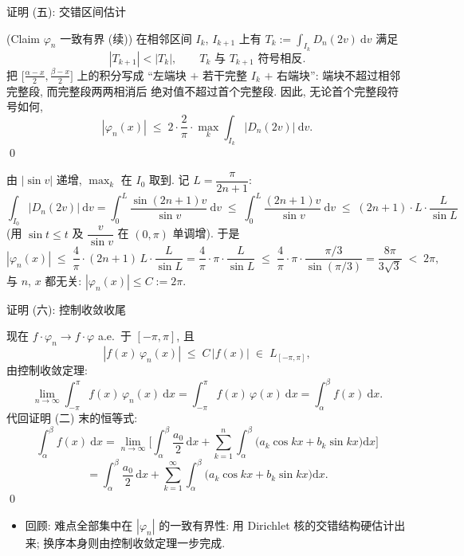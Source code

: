 \begin{frame}{证明 (五): 交错区间估计}

\startproof[bg=yellow, fg=red](Claim $\varphi_n$ 一致有界 (续))
在相邻区间 $I_k$, $I_{k+1}$ 上有
$T_k := \int_{I_k} D_n(2v) ~ \mathrm{d} v$ 满足
\[
|T_{k+1}| < |T_k|,
\qquad
T_k \text{ 与 } T_{k+1} \text{ 符号相反} .
\]
把 $\big[ \tfrac{\alpha - x}{2}, \tfrac{\beta - x}{2} \big]$ 上的积分写成
``左端块 $+$ 若干完整 $I_k$ $+$ 右端块'': 端块不超过相邻完整段, 而完整段两两相消后
绝对值不超过首个完整段. 因此, 无论首个完整段符号如何,
\[
|\varphi_n(x)|
\;\leqslant\; 2 \cdot \frac{2}{\pi} \cdot \max_k \int_{I_k} |D_n(2v)| ~ \mathrm{d} v .
\]
\qed

\pause

由 $|\sin v|$ 递增, $\max_k$ 在 $I_0$ 取到. 记 $L = \dfrac{\pi}{2n+1}$:
\[
\int_{I_0} |D_n(2v)| ~ \mathrm{d} v
= \int_0^{L} \frac{\sin (2n+1)v}{\sin v} ~ \mathrm{d} v
\;\leqslant\; \int_0^{L} \frac{(2n+1)v}{\sin v} ~ \mathrm{d} v
\;\leqslant\; (2n+1) \cdot L \cdot \frac{L}{\sin L}
\]
(用 $\sin t \leqslant t$ 及 $\dfrac{v}{\sin v}$ 在 $(0, \pi)$ 单调增). 于是
\[
|\varphi_n(x)| \;\leqslant\; \frac{4}{\pi} \cdot (2n+1)\, L \cdot \frac{L}{\sin L}
= \frac{4}{\pi} \cdot \pi \cdot \frac{L}{\sin L}
\;\leqslant\; \frac{4}{\pi} \cdot \pi \cdot \frac{\pi/3}{\sin(\pi/3)}
= \frac{8\pi}{3\sqrt{3}}
\;<\; 2\pi ,
\]
与 $n$, $x$ 都无关: $|\varphi_n(x)| \leqslant C := 2\pi$.

\end{frame}


\begin{frame}{证明 (六): 控制收敛收尾}

现在 $f \cdot \varphi_n \to f \cdot \varphi$ a.e.\ 于 $[-\pi, \pi]$, 且
\[
|f(x)\, \varphi_n(x)| \;\leqslant\; C\, |f(x)| \;\in\; L_{[-\pi, \pi]} ,
\]
由\alert{控制收敛定理}:
\[
\lim_{n \to \infty} \int_{-\pi}^{\pi} f(x)\, \varphi_n(x) ~ \mathrm{d} x
= \int_{-\pi}^{\pi} f(x)\, \varphi(x) ~ \mathrm{d} x
= \int_{\alpha}^{\beta} f(x) ~ \mathrm{d} x .
\]
代回证明 (二) 末的恒等式:
\[
\int_{\alpha}^{\beta} f(x) ~ \mathrm{d} x
= \lim_{n \to \infty} \Big[ \int_{\alpha}^{\beta} \frac{a_0}{2}\, \mathrm{d} x
+ \sum_{k=1}^{n} \int_{\alpha}^{\beta}
\big( a_k \cos kx + b_k \sin kx \big) \mathrm{d} x \Big]
\]
\[
= \int_{\alpha}^{\beta} \frac{a_0}{2}\, \mathrm{d} x
+ \sum_{k=1}^{\infty} \int_{\alpha}^{\beta}
\big( a_k \cos kx + b_k \sin kx \big) \mathrm{d} x .
\]
\qed

\pause

\begin{itemize}
\item 回顾: 难点全部集中在 $|\varphi_n|$ 的\alert{一致有界性}:
  用 Dirichlet 核的交错结构硬估计出来; 换序本身则由控制收敛定理一步完成.
\end{itemize}

\end{frame}

